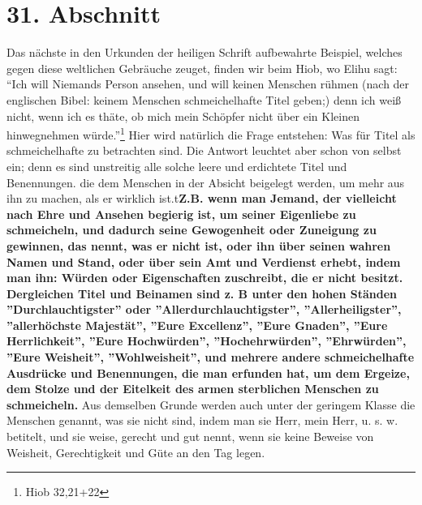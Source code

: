 \section{31. Abschnitt} \label{kap9_ab31}

Das nächste in den Urkunden der heiligen Schrift aufbewahrte Beispiel, welches
gegen diese weltlichen Gebräuche zeuget, finden wir beim Hiob, wo Elihu sagt:
"`Ich will Niemands Person ansehen, und will keinen Menschen rühmen (nach der
englischen Bibel: keinem Menschen schmeichelhafte Titel geben;) denn ich weiß
nicht, wenn ich es thäte, ob mich mein Schöpfer nicht über ein Kleinen
hinwegnehmen würde."'\footnote{Hiob 32,21+22} Hier wird natürlich die Frage
entstehen: Was für Titel als schmeichelhafte zu betrachten sind. Die Antwort
leuchtet aber schon von selbst ein; denn es sind unstreitig alle solche leere
und erdichtete Titel und Benennungen. die dem Menschen in der Absicht beigelegt
werden, um mehr aus ihn zu machen, als er wirklich ist.t\textbf{Z.B. wenn man Jemand,
der vielleicht nach Ehre und Ansehen begierig ist, um seiner Eigenliebe zu
schmeicheln, und dadurch seine Gewogenheit oder Zuneigung zu gewinnen, das
nennt, was er nicht ist, oder ihn über seinen wahren Namen und Stand, oder über
sein Amt und Verdienst erhebt, indem man ihn: Würden oder Eigenschaften
zuschreibt, die er nicht besitzt. Dergleichen Titel und Beinamen sind z. B unter
den hohen Ständen ''Durchlauchtigster'' oder ''Allerdurchlauchtigster'',
''Allerheiligster'', ''allerhöchste Majestät'', ''Eure Excellenz'', ''Eure
Gnaden'', ''Eure Herrlichkeit'', ''Eure Hochwürden'', ''Hochehrwürden'',
''Ehrwürden'', ''Eure Weisheit'', ''Wohlweisheit'', und mehrere andere
schmeichelhafte Ausdrücke und Benennungen, die man erfunden hat, um dem Ergeize,
dem Stolze und der Eitelkeit des armen sterblichen Menschen zu schmeicheln.}
Aus demselben Grunde werden auch unter der geringem Klasse die Menschen
genannt, was sie nicht sind, indem man sie Herr, mein Herr, u. s. w. betitelt,
und sie weise, gerecht und gut nennt, wenn sie keine Beweise von Weisheit,
Gerechtigkeit und Güte an den Tag legen.

\medskip

